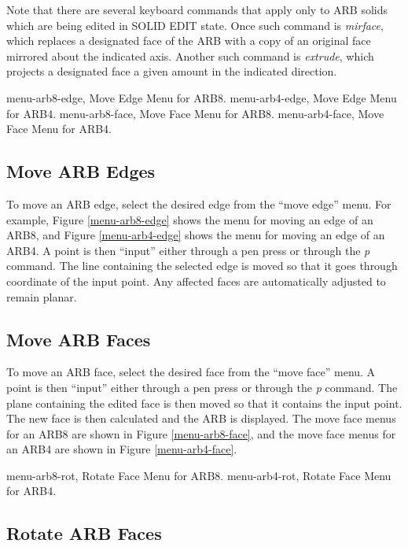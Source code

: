 Note that there are several keyboard commands that apply only to ARB solids
which are being edited in SOLID EDIT state.
Once such command is {\em mirface}, which replaces a designated
face of the ARB with a copy of an original face mirrored about
the indicated axis.
Another such command is {\em extrude}, which projects a designated face
a given amount in the indicated direction.

\mfig menu-arb8-edge, Move Edge Menu for ARB8.
\mfig menu-arb4-edge, Move Edge Menu for ARB4.
\mfig menu-arb8-face, Move Face Menu for ARB8.
\mfig menu-arb4-face, Move Face Menu for ARB4.

\subsection{Move ARB Edges}

To move an ARB edge, select the desired edge from the ``move edge'' menu.
For example, Figure \ref{menu-arb8-edge} shows the menu for
moving an edge of an ARB8, and Figure \ref{menu-arb4-edge}
shows the menu for moving an edge of an ARB4.
A point is then ``input'' either through a pen press or through the {\em p}
command.
The line containing the selected edge is moved so that it goes through
coordinate of the input point.
Any affected faces are automatically adjusted to remain planar.

\subsection{Move ARB Faces}

To move an ARB face, select the desired face from the ``move face'' menu.
A point is then ``input'' either through a pen press or through the {\em p}
command.  The plane containing the edited face is then moved so that it
contains the input point.  The new face is then calculated and the ARB
is displayed.
The move face menus for an ARB8 are shown
in Figure \ref{menu-arb8-face}, and the move face menus for an ARB4
are shown in Figure \ref{menu-arb4-face}.

\mfig menu-arb8-rot, Rotate Face Menu for ARB8.
\mfig menu-arb4-rot, Rotate Face Menu for ARB4.

\subsection{Rotate ARB Faces}

